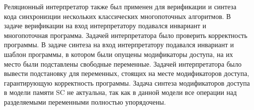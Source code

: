     
    
    
    
    
    
    
    
    

Реляционный интерпретатор также был применен для верификации 
и синтеза кода синхронизции нескольких классических многопоточных алгоритмов.
В задаче верификации на вход интерпретатору подавался инвариант и многопоточная программа.
Задачей интерпретатора было проверить корректность программы. 
В задаче синтеза на вход интерпретатору подавался инвариант и шаблон программы,
в котором были опущены модификаторы доступа, 
на их место были подставлены свободные переменные.
Задачей интерпретатора было вывести подстановку для переменных,
стоящих на месте модификаторов доступа, 
гарантирующую корректность программы.
Задача синтеза модификаторов доступа в модели памяти SC не актуальна,
так как в данной модели все операции над разделяемыми переменными полностью упорядочены.

